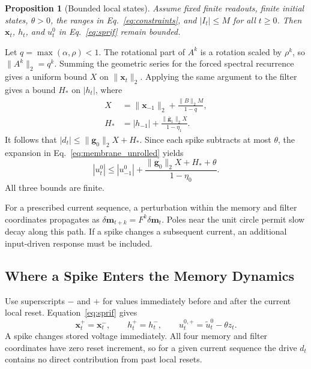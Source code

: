 \documentclass[letterpaper,journal]{IEEEtran}
\newtheorem{proposition}{Proposition}
\begin{document}
\begin{proposition}[Bounded local states]
Assume fixed finite readouts, finite initial states, $\theta>0$, the ranges in Eq.~\eqref{eq:constraints}, and $|I_t|\leq M$ for all $t\geq0$. Then $\mathbf x_t$, $h_t$, and $u_t^0$ in Eq.~\eqref{eq:sprif} remain bounded.
\label{prop:boundedness}
\end{proposition}
\begin{IEEEproof}
Let $q=\max(\alpha,\rho)<1$. The rotational part of $A^k$ is a rotation scaled by $\rho^k$, so $\|A^k\|_2=q^k$. Summing the geometric series for the forced spectral recurrence gives a uniform bound $X$ on $\|\mathbf x_t\|_2$. Applying the same argument to the filter gives a bound $H_*$ on $|h_t|$, where
\begin{equation}
\begin{aligned}
X &= \|\mathbf x_{-1}\|_2 + \frac{\|B\|_2 M}{1-q},\\
H_* &= |h_{-1}| + \frac{\|\bar{\mathbf g}_1\|_2 X}{1-\eta_1}.
\end{aligned}
\label{eq:local_bounds}
\end{equation}
It follows that $|d_t|\leq \|\mathbf g_0\|_2X+H_*$. Since each spike subtracts at most $\theta$, the expansion in Eq.~\eqref{eq:membrane_unrolled} yields
\begin{equation}
|u_t^0|\leq |u_{-1}^0|+
\frac{\|\mathbf g_0\|_2 X+H_*+\theta}{1-\eta_0}.
\label{eq:u_bound}
\end{equation}
All three bounds are finite.
\end{IEEEproof}

For a prescribed current sequence, a perturbation within the memory and filter coordinates propagates as $\delta\mathbf m_{t+k}=F^k\delta\mathbf m_t$. Poles near the unit circle permit slow decay along this path. If a spike changes a subsequent current, an additional input-driven response must be included.

\subsection{Where a Spike Enters the Memory Dynamics}
\label{sec:reset}

Use superscripts $-$ and $+$ for values immediately before and after the current local reset. Equation~\eqref{eq:sprif} gives
\begin{equation}
\mathbf x_t^+=\mathbf x_t^-,
\qquad h_t^+=h_t^-,
\qquad u_t^{0,+}=\widetilde u_t^0-\theta z_t.
\label{eq:reset_identity}
\end{equation}
A spike changes stored voltage immediately. All four memory and filter coordinates have zero reset increment, so for a given current sequence the drive $d_t$ contains no direct contribution from past local resets.
\end{document}
